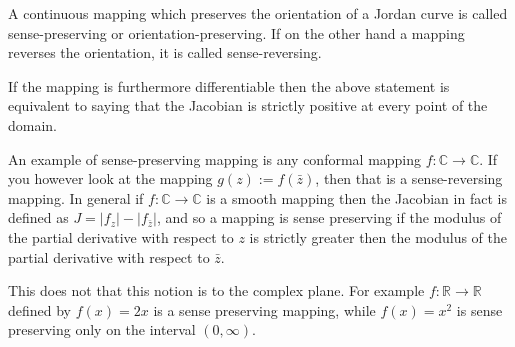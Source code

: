 \documentclass[12pt]{article}
\begin{document}
A continuous mapping which preserves the orientation of a Jordan curve is called sense-preserving or orientation-preserving.  If on the other hand a mapping reverses the orientation, it is called sense-reversing.

If the mapping is furthermore differentiable then the above statement is equivalent to saying that the Jacobian is strictly positive at every point of the domain.

An example of sense-preserving mapping is any conformal mapping $f : {\mathbb{C}} \rightarrow {\mathbb{C}}$.  If you however look at the mapping $g(z) := f(\bar{z})$, then that is a sense-reversing mapping.  In general if $f : {\mathbb{C}} \rightarrow {\mathbb{C}}$ is a smooth mapping then the Jacobian in fact is defined as $J = |f_z| - |f_{\bar{z}}|$, and so a mapping is sense preserving if the modulus of the partial derivative with respect to $z$ is strictly greater then the modulus of the partial derivative with respect to $\bar{z}$.

This does not  that this notion is  to the complex plane.  For example $f : {\mathbb{R}} \rightarrow {\mathbb{R}}$ defined by $f(x) = 2x$ is a sense preserving mapping, while $f(x) = x^2$ is sense preserving only on the
interval $(0,\infty)$.
\end{document}
